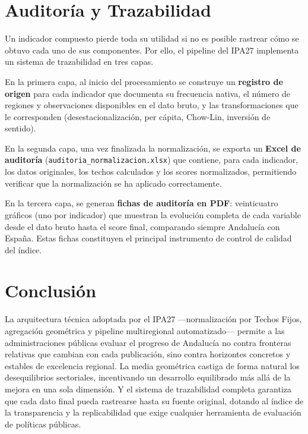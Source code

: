 \documentclass[12pt,a4paper]{article}
\begin{document}
\section{Auditoría y Trazabilidad}

Un indicador compuesto pierde toda su utilidad si no es posible rastrear cómo se obtuvo cada uno de sus componentes. Por ello, el pipeline del IPA27 implementa un sistema de trazabilidad en tres capas.

En la primera capa, al inicio del procesamiento se construye un \textbf{registro de origen} para cada indicador que documenta su frecuencia nativa, el número de regiones y observaciones disponibles en el dato bruto, y las transformaciones que le corresponden (desestacionalización, per cápita, Chow-Lin, inversión de sentido).

En la segunda capa, una vez finalizada la normalización, se exporta un \textbf{Excel de auditoría} (\texttt{auditoria\_normalizacion.xlsx}) que contiene, para cada indicador, los datos originales, los techos calculados y los scores normalizados, permitiendo verificar que la normalización se ha aplicado correctamente.

En la tercera capa, se generan \textbf{fichas de auditoría en PDF}: veinticuatro gráficos (uno por indicador) que muestran la evolución completa de cada variable desde el dato bruto hasta el score final, comparando siempre Andalucía con España. Estas fichas constituyen el principal instrumento de control de calidad del índice.

\section{Conclusión}

La arquitectura técnica adoptada por el IPA27 ---normalización por Techos Fijos, agregación geométrica y pipeline multiregional automatizado--- permite a las administraciones públicas evaluar el progreso de Andalucía no contra fronteras relativas que cambian con cada publicación, sino contra horizontes concretos y estables de excelencia regional. La media geométrica castiga de forma natural los desequilibrios sectoriales, incentivando un desarrollo equilibrado más allá de la mejora en una sola dimensión. Y el sistema de trazabilidad completa garantiza que cada dato final pueda rastrearse hasta su fuente original, dotando al índice de la transparencia y la replicabilidad que exige cualquier herramienta de evaluación de políticas públicas.
\end{document}
